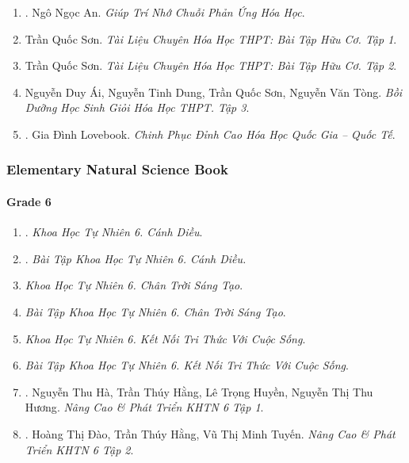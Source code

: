 \documentclass{article}
\begin{document}
\begin{enumerate}
	\item \cite{An_chuoi_PUHH}. Ngô Ngọc An. {\it Giúp Trí Nhớ Chuỗi Phản Ứng Hóa Học}.\hfill{\sf[reading]}
	
	\item Trần Quốc Sơn. {\it Tài Liệu Chuyên Hóa Học THPT: Bài Tập Hữu Cơ. Tập 1}.
	
	\item Trần Quốc Sơn. {\it Tài Liệu Chuyên Hóa Học THPT: Bài Tập Hữu Cơ. Tập 2}.
	
	\item Nguyễn Duy Ái, Nguyễn Tinh Dung, Trần Quốc Sơn, Nguyễn Văn Tòng. {\it Bồi Dưỡng Học Sinh Giỏi Hóa Học THPT. Tập 3}.
	
	\item \cite{Lovebook2022}. Gia Đình Lovebook. {\it Chinh Phục Đỉnh Cao Hóa Học Quốc Gia -- Quốc Tế}.\hfill{\sf[reading]}
\end{enumerate}

\subsubsection{Elementary Natural Science Book}

\paragraph{Grade 6}

\begin{enumerate}
	\item \cite{SGK_KHTN_6_Canh_Dieu}. {\it Khoa Học Tự Nhiên 6. Cánh Diều}.\hfill{\sf[done]}
	
	\item \cite{SBT_KHTN_6_Canh_Dieu}. {\it Bài Tập Khoa Học Tự Nhiên 6. Cánh Diều.}\hfill{\sf[done]}
	
	\item {\it Khoa Học Tự Nhiên 6. Chân Trời Sáng Tạo}.
	
	\item {\it Bài Tập Khoa Học Tự Nhiên 6. Chân Trời Sáng Tạo}.
	
	\item {\it Khoa Học Tự Nhiên 6. Kết Nối Tri Thức Với Cuộc Sống}.
	
	\item {\it Bài Tập Khoa Học Tự Nhiên 6. Kết Nối Tri Thức Với Cuộc Sống}.
	
	\item \cite{ncpt_KHTN_6_tap_1}. {\sc Nguyễn Thu Hà, Trần Thúy Hằng, Lê Trọng Huyền, Nguyễn Thị Thu Hương}. {\it Nâng Cao \& Phát Triển KHTN 6 Tập 1}.\hfill{\sf[done]}
	
	\item \cite{ncpt_KHTN_6_tap_2}. {\sc Hoàng Thị Đào, Trần Thúy Hằng, Vũ Thị Minh Tuyến}. {\it Nâng Cao \& Phát Triển KHTN 6 Tập 2}.\hfill{\sf[done]}
\end{enumerate}
\end{document}
